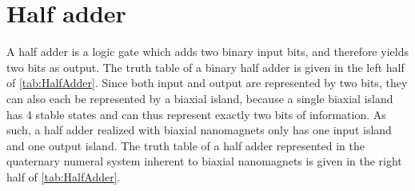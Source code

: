 \documentclass[twocolumn]{phdsymp}
\begin{document}
\section{Half adder}
A half adder is a logic gate which adds two binary input bits, and therefore yields two bits as
output. The truth table of a binary half adder is given in the left half of \cref{tab:HalfAdder}. Since both input and output are represented by two bits, they can also each be represented by a biaxial island, because a single biaxial island has 4 stable states and can thus represent exactly two bits of information. As such, a half adder realized with biaxial nanomagnets only has one input island and one output island. The truth table of a half adder represented in the quaternary numeral system inherent to biaxial nanomagnets is given in the right half of \cref{tab:HalfAdder}.
\end{document}
